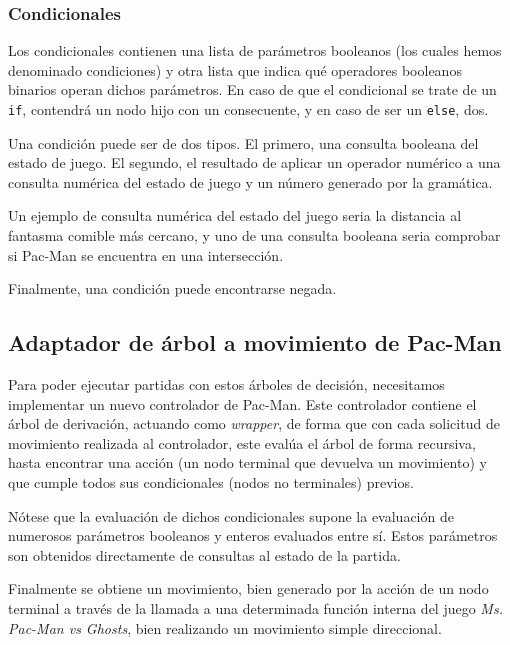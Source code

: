 \subsubsection{Condicionales}
Los condicionales contienen una lista de parámetros booleanos (los cuales hemos denominado condiciones) y otra lista que indica qué operadores booleanos binarios operan dichos parámetros. En caso de que el condicional se trate de un \texttt{if}, contendrá un nodo hijo con un consecuente, y en caso de ser un \texttt{else}, dos.

Una condición puede ser de dos tipos. El primero, una consulta booleana del estado de juego. El segundo, el resultado de aplicar un operador numérico a una consulta numérica del estado de juego y un número generado por la gramática.
 
Un ejemplo de consulta numérica del estado del juego seria la distancia al fantasma comible más cercano, y uno de una consulta booleana seria comprobar si Pac-Man se encuentra en una intersección.

Finalmente, una condición puede encontrarse negada.

\subsection{Adaptador de árbol a movimiento de Pac-Man}
Para poder ejecutar partidas con estos árboles de decisión, necesitamos implementar un nuevo controlador de Pac-Man. Este controlador contiene el árbol de derivación, actuando como \textit{wrapper}, de forma que con cada solicitud de movimiento realizada al controlador, este evalúa el árbol de forma recursiva, hasta encontrar una acción (un nodo terminal que devuelva un movimiento) y que cumple todos sus condicionales (nodos no terminales) previos.

Nótese que la evaluación de dichos condicionales supone la evaluación de numerosos parámetros booleanos y enteros evaluados entre sí. Estos parámetros son obtenidos directamente de consultas al estado de la partida.

Finalmente se obtiene un movimiento, bien generado por la acción de un nodo terminal a través de la llamada a una determinada función interna del juego \textit{Ms. Pac-Man vs Ghosts}, bien realizando un movimiento simple direccional.

